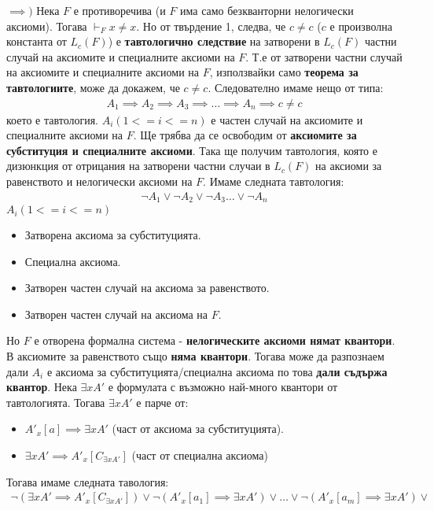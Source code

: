 \documentclass[french]{article}
\begin{document}
$\implies )$ Нека $F$ е противоречива (и $F$  има само безкванторни нелогически аксиоми). Тогава $\vdash_F x \neq x $. Но от твърдение 1, следва, че $c \neq c$ ($c$ е произволна константа от $L_c(F)$) е \textbf{тавтологично следствие} на затворени в $L_c(F)$ частни случай на аксиомите и специалните аксиоми на $F$. \newline
Т.е от затворени частни случай на аксиомите и специалните аксиоми на $F$, използвайки само \textbf{теорема за тавтологиите}, може да докажем, че $c \neq c$.
Следователно имаме нещо от типа:
\begin{align*}
A_1 \implies A_2 \implies A_3 \implies \dots \implies A_n \implies c \neq c
\end{align*}
което е тавтология. $A_i (1<= i <= n)$ е частен случай на аксиомите и специалните аксиоми на $F$.
Ще трябва да се освободим от \textbf{аксиомите за субституция и специалните аксиоми}.
Така ще получим тавтология, която е дизюнкция от отрицания на затворени частни случаи в $L_c(F)$ на аксиоми за равенството и нелогически аксиоми на $F$.
Имаме следната тавтология:
\begin{align*}
\neg A_1 \lor \neg A_2 \lor \neg A_3 \dots \lor \neg A_n
\end{align*}
$A_i (1<= i <= n)$
\begin{itemize} 
	\item Затворена аксиома за субституцията.
	\item Специална аксиома.
	\item Затворен частен случай на аксиома за равенството.
	\item Затворен частен случай на аксиома на $F$.
\end{itemize}
Но $F$ е отворена формална система - \textbf{нелогическите аксиоми нямат квантори}. В аксиомите за равенството също \textbf{няма квантори}.
Тогава може да разпознаем дали $A_i$ е аксиома за субституцията/специална аксиома по това \textbf{дали съдържа квантор}. \newline
Нека $\exists x A'$ е формулата с възможно най-много квантори от тавтологията.
Тогава $\exists x A'$ е парче от: 
\begin{itemize} 
	\item $A'_x[a] \implies \exists x A'$ (част от аксиома за субституцията).
	\item $\exists x A' \implies A'_x[C_{\exists x A'}]$ (част от специална аксиома)
\end{itemize}
Тогава имаме следната тавология:
\begin{align*}
\neg (\exists x A' \implies A'_x[C_{\exists x A'}]) \lor 	\neg (A'_x[a_1] \implies \exists x A') \lor \dots 	\lor \neg(A'_x[a_m] \implies \exists x A')  \lor 
\end{align*}
\end{document}
